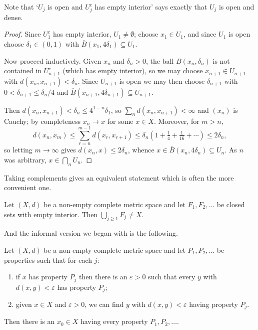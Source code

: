 Note that `$U_j$ is open and $U_j^c$ has empty interior' says exactly that $U_j$ is open and dense.

\begin{proof}
	Since $U_1^c$ has empty interior, $U_1 \neq\emptyset$; choose $x_1\in U_1$, and since $U_1$ is open choose $\delta_1 \in (0,1)$ with $\overline B(x_1,4\delta_1)\subseteq U_1$.

	Now proceed inductively. Given $x_n$ and $\delta_n>0$, the ball $B(x_n,\delta_n)$ is not contained in $U_{n+1}^c$ (which has empty interior), so we may choose $x_{n+1}\in U_{n+1}$ with $d(x_n,x_{n+1})<\delta_n$. Since $U_{n+1}$ is open we may then choose $\delta_{n+1}$ with $0<\delta_{n+1}\leq\delta_n/4$ and $\overline B(x_{n+1},4\delta_{n+1})\subseteq U_{n+1}$.

	Then $d(x_n,x_{n+1})<\delta_n \leq 4^{1-n}\delta_1$, so $\sum_n d(x_n,x_{n+1})<\infty$ and $(x_n)$ is Cauchy; by completeness $x_n \to x$ for some $x\in X$. Moreover, for $m>n$,
	$$d(x_n,x_m)\leq\sum_{r=n}^{m-1}d(x_r,x_{r+1}) \leq \delta_n\left(1+\tfrac14+\tfrac1{16}+\cdots\right)\leq 2\delta_n,$$
	so letting $m\to\infty$ gives $d(x_n,x)\leq2\delta_n$, whence $x\in \overline B(x_n,4\delta_n)\subseteq U_n$. As $n$ was arbitrary, $x\in\bigcap_nU_n$.
\end{proof}

Taking complements gives an equivalent statement which is often the more convenient one.

\begin{theorem}\label{thm:baire-closed}
	Let $(X,d)$ be a non-empty complete metric space and let $F_1,F_2,\ldots$ be closed sets with empty interior. Then $\bigcup_{j\geq1}F_j\neq X$.
\end{theorem}

And the informal version we began with is the following.

\begin{theorem}\label{thm:baire-properties}
	Let $(X,d)$ be a non-empty complete metric space and let $P_1,P_2,\ldots$ be properties such that for each $j$:
	\begin{enumerate}[label=(\roman*)]
		\item if $x$ has property $P_j$ then there is an $\varepsilon>0$ such that every $y$ with $d(x,y)<\varepsilon$ has property $P_j$;
		\item given $x\in X$ and $\varepsilon>0$, we can find $y$ with $d(x,y)<\varepsilon$ having property $P_j$.
	\end{enumerate}
	Then there is an $x_0\in X$ having every property $P_1,P_2,\ldots$.
\end{theorem}

